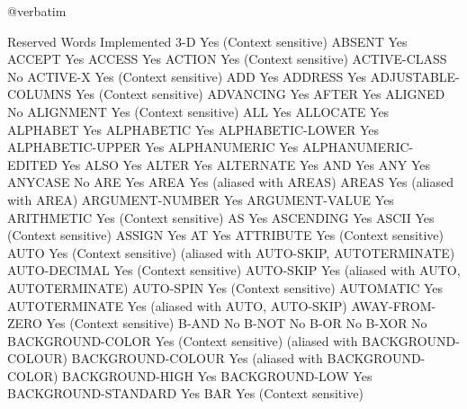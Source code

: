 @verbatim

Reserved Words                  Implemented
3-D                             Yes (Context sensitive)
ABSENT                          Yes
ACCEPT                          Yes
ACCESS                          Yes
ACTION                          Yes (Context sensitive)
ACTIVE-CLASS                    No
ACTIVE-X                        Yes (Context sensitive)
ADD                             Yes
ADDRESS                         Yes
ADJUSTABLE-COLUMNS              Yes (Context sensitive)
ADVANCING                       Yes
AFTER                           Yes
ALIGNED                         No
ALIGNMENT                       Yes (Context sensitive)
ALL                             Yes
ALLOCATE                        Yes
ALPHABET                        Yes
ALPHABETIC                      Yes
ALPHABETIC-LOWER                Yes
ALPHABETIC-UPPER                Yes
ALPHANUMERIC                    Yes
ALPHANUMERIC-EDITED             Yes
ALSO                            Yes
ALTER                           Yes
ALTERNATE                       Yes
AND                             Yes
ANY                             Yes
ANYCASE                         No
ARE                             Yes
AREA                            Yes (aliased with AREAS)
AREAS                           Yes (aliased with AREA)
ARGUMENT-NUMBER                 Yes
ARGUMENT-VALUE                  Yes
ARITHMETIC                      Yes (Context sensitive)
AS                              Yes
ASCENDING                       Yes
ASCII                           Yes (Context sensitive)
ASSIGN                          Yes
AT                              Yes
ATTRIBUTE                       Yes (Context sensitive)
AUTO                            Yes (Context sensitive) (aliased with AUTO-SKIP, AUTOTERMINATE)
AUTO-DECIMAL                    Yes (Context sensitive)
AUTO-SKIP                       Yes (aliased with AUTO, AUTOTERMINATE)
AUTO-SPIN                       Yes (Context sensitive)
AUTOMATIC                       Yes
AUTOTERMINATE                   Yes (aliased with AUTO, AUTO-SKIP)
AWAY-FROM-ZERO                  Yes (Context sensitive)
B-AND                           No
B-NOT                           No
B-OR                            No
B-XOR                           No
BACKGROUND-COLOR                Yes (Context sensitive) (aliased with BACKGROUND-COLOUR)
BACKGROUND-COLOUR               Yes (aliased with BACKGROUND-COLOR)
BACKGROUND-HIGH                 Yes
BACKGROUND-LOW                  Yes
BACKGROUND-STANDARD             Yes
BAR                             Yes (Context sensitive)

